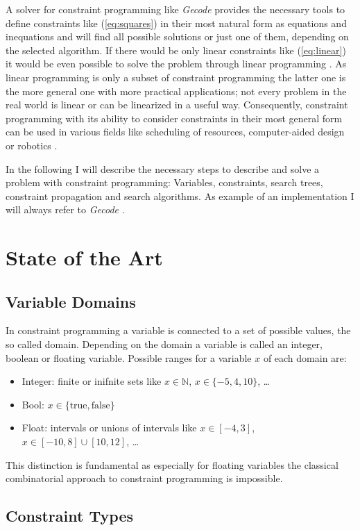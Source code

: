 \documentclass[10pt,
               a4paper,
               journal,
               ]{IEEEtran}
\newcommand{\refeq}[1]{{(\ref{#1})}}
\begin{document}
	A solver for constraint programming like \emph{Gecode} provides the necessary tools to define constraints like \refeq{eq:squares} in their most natural form as equations and inequations and will find all possible solutions or just one of them, depending on the selected algorithm. If there would be only linear constraints like \refeq{eq:linear} it would be even possible to solve the problem through linear programming \cite[1]{linearProgramming}. As linear programming is only a subset of constraint programming the latter one is the more general one with more practical applications; not every problem in the real world is linear or can be linearized in a useful way. Consequently, constraint programming with its ability to consider constraints in their most general form can be used in various fields like scheduling of resources, computer-aided design or robotics \cite[p.~221]{trendsInCP}.
	
	In the following I will describe the necessary steps to describe and solve a problem with constraint programming: Variables, constraints, search trees, constraint propagation and search algorithms. As example of an implementation I will always refer to \emph{Gecode} \cite{gecode}.
	
	\section{State of the Art}
	\subsection{Variable Domains}
	In constraint programming a variable is connected to a set of possible values, the so called domain. Depending on the domain a variable is called an integer, boolean or floating variable. Possible ranges for a variable $x$ of each domain are:
	\begin{itemize}
		\item Integer: finite or inifnite sets like $x \in \mathbb{N}$, $x \in \{-5, 4, 10\}$, \dots
		\item Bool: $x \in \{\text{true}, \text{false}\}$
		\item Float: intervals or unions of intervals like $x \in [-4, 3]$, $x \in [-10, 8] \cup [10, 12]$, \dots
	\end{itemize}
	This distinction is fundamental as especially for floating variables the classical combinatorial approach to constraint programming is impossible.
	
	\subsection{Constraint Types}
	
\end{document}
